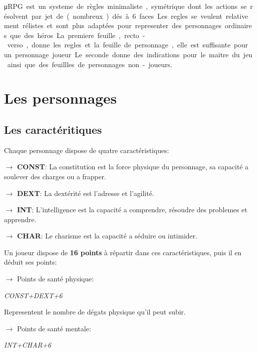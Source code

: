 ﻿\begin{landscape}
\begin{multicols}{4}


\date{} %
\maketitle{}


\si\micro RPG est un systeme de règles minimaliste, symétrique dont les actions se résolvent par jet de (nombreux) dés à 6 faces.
Les regles se veulent relativement rélistes et sont plus adaptées pour representer des personnages ordinaires que des héros.

La premiere feuille, recto-verso, donne les regles et la feuille de personnage, elle est suffisante pour un personnage joueur.
Le seconde donne des indications pour le maitre du jeu ainsi que des feuillles de personnages non-joueurs.

\section{Les personnages} 


\subsection{Les caractéritiques}

Chaque personnage dispose de quatre caractéristiques:


$\rightarrow$ \textbf{CONST}: La constitution est la force physique du personnage, sa capacité a soulever des charges ou a frapper.

$\rightarrow$ \textbf{DEXT}: La dextérité  est l'adresse et l'agilité.

$\rightarrow$ \textbf{INT}: L’intelligence est la capacité a comprendre, résoudre des problemes et apprendre.

$\rightarrow$ \textbf{CHAR}: Le charisme est la capacité a séduire ou intimider.


Un joueur dispose de \textbf{16 points} à répartir dans ces caractéristiques, puis il en déduit ses points:


$\rightarrow$ Points de santé physique:

\textit{CONST+DEXT+6}

Representent le nombre de dégats physique qu'il peut subir.


$\rightarrow$ Points de santé mentale:

\textit{INT+CHAR+6}


\end{multicols}
\end{landscape}
